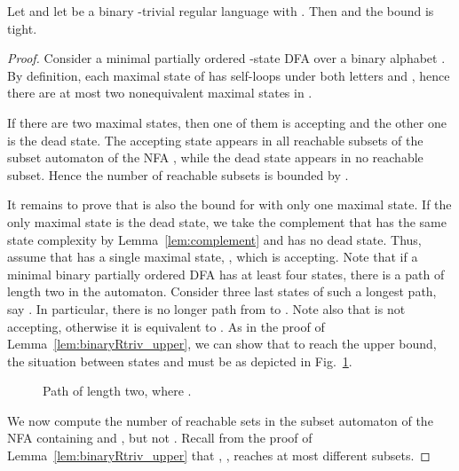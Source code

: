\documentclass[runningheads]{llncs}
\newcommand{\R}{}
\begin{document}
  \begin{lemma}\label{lem:eight}
    Let  and let  be a binary \R-trivial regular language with .
    Then  and the bound is tight.
  \end{lemma}
  \begin{proof}
    Consider a minimal partially ordered -state DFA 
    over a binary alphabet .
    By definition, each maximal state of  has self-loops under both letters  and , hence there are at most two nonequivalent maximal states in .
    
    If there are two maximal states,
    then one of them is accepting and the other one is the dead state.
    The accepting state appears in all reachable subsets
    of the subset automaton of the NFA ,
    while the dead state appears in no reachable subset.
    Hence the number of reachable subsets is bounded by .
    
    It remains to prove that  is also the bound for  with only one maximal state.
    If the only maximal state is the dead state, we take the complement that has the same state complexity by Lemma~\ref{lem:complement}
    and has no dead state. 
    Thus, assume that  has a single maximal state, , which is accepting.
    Note that if a minimal binary partially ordered DFA has at least four states,
    there is a path of length two in the automaton.
    Consider three last states of such a longest path, say .
    In particular, there is no longer path from  to .  
    Note also that  is not accepting, otherwise it is equivalent to .
    As in the proof of Lemma~\ref{lem:binaryRtriv_upper},
    we can show that to reach the upper bound,
    the situation between states  and  must be as depicted in Fig.~\ref{fig:bound4}.
    \begin{figure}[t]
      \centering
      \caption{Path of length two, where .}
      \label{fig:bound4}
    \end{figure}
    
    We now compute the number of reachable sets in the subset automaton of the NFA 
    containing  and , but not .
    Recall from the proof of Lemma~\ref{lem:binaryRtriv_upper} that , ,
    reaches at most  different subsets. 


\end{proof}
\end{document}
